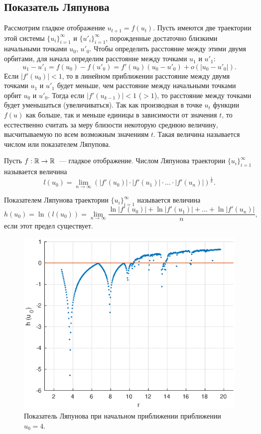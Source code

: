 \subsection{Показатель Ляпунова}

Рассмотрим гладкое отображение $u_{t+1} = f(u_t)$. Пусть имеются две траектории этой системы $\{u_i\}_{i=1}^{\infty}$ и $\{u'_i\}_{i=1}^{\infty}$, порожденные достаточно близкими начальными точками $u_0$, $u'_0$. Чтобы определить расстояние между этими двумя орбитами, для начала определим расстояние между точками $u_1$ и $u'_1$:
$$
        u_1-u'_1 = f(u_0)-f(u'_0) = f'(u_0)(u_0-u'_0)+o(|u_0-u'_0|).
$$
Если $|f'(u_0)| < 1$, то в линейном приближении расстояние между двумя точками $u_1$ и $u'_1$ будет меньше, чем расстояние между начальными точками орбит $u_0$ и $u'_0$. Тогда если $|f'(u_{k-1})| < 1$ ($>1$), то расстояние между точками будет уменьшаться (увеличиваться). Так как производная в точке $u_t$ функции $f(u)$ как больше, так и меньше единицы в зависимости от значения $t$, то есстественно считать за меру близости некоторую среднюю величину, высчитываемую по всем возможным значениям $t$. Такая величина называется числом или показателем Ляпупова. \cite[стр.~93]{bratus10}

\begin{definition}
        Пусть $f:\mathbb{R}\rightarrow\mathbb{R}$~--- гладкое отображение. Числом Ляпунова траектории $\{u_i\}_{i=1}^{\infty}$ называется величина
        $$
                l(u_0) = \lim\limits_{n \to \infty}\left( |f'(u_0)| \cdot |f'(u_1)| \cdot \ldots \cdot |f'(u_n)| \right)^{\frac{1}{n}}.
        $$
        \cite[стр.~94]{bratus10}
\end{definition}
            
\begin{definition}
        Показателем Ляпунова траектории $\{u_i\}_{i=1}^{\infty}$ называется величина
        $$
                h(u_0) = \ln(l(u_0)) = \lim\limits_{n \to \infty} \frac{\ln|f'(u_0)| + \ln|f'(u_1)| + \ldots + \ln|f'(u_n)|}{n},
        $$
        если этот предел существует. \cite[стр.~94]{bratus10}
\end{definition}
            
\begin{figure}[h]
        \centering
        \includegraphics[width=0.6\linewidth]{img/one_step_lyapunov.eps}
        \caption{Показатель Ляпунова при начальном приближении приближении $u_0 = 4$.}
        \label{img:one_step_lyapunov}
\end{figure}
